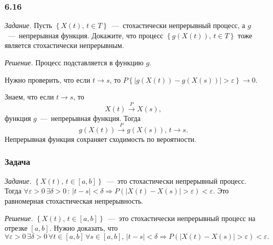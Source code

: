 \subsubsection*{6.16}

\textit{Задание.}
Пусть $ \left\{ X \left( t \right), \, t \in T \right\} $~---~стохастически непрерывный процесс,
а $g$~---~непрерывная функция.
Докажите, что процесс $ \left\{ g \left( X \left( t \right) \right), \, t \in T \right\} $
тоже является стохастически непрерывным.

\textit{Решение.}
Процесс подставляется в функцию $g$.

Нужно проверить, что если $t \to s$, то
$P \left\{
    \left| g \left( X \left( t \right) \right) - g \left( X \left( s \right) \right) \right| >
    \varepsilon \right\}
  \to 0$.

Знаем, что если $t \to s$, то
\begin{equation*}
  X \left( t \right) \overset{P}{ \to }
  X \left( s \right),
\end{equation*}
функция $g$~---~непрерывная функция.
Тогда
\begin{equation*}
  g \left( X \left( t \right) \right) \overset{P}{ \to } g \left( X \left( s \right) \right), \,
  t \to s.
\end{equation*}
Непрерывная функция сохраняет сходимость по вероятности.

\subsubsection*{Задача}

\textit{Задание.}
$ \left\{ X \left( t \right), \, t \in \left[ a, b \right] \right\}$~---~это
стохастически непрерывный процесс.
Тогда
$ \forall \varepsilon > 0 \,
  \exists \delta > 0 \, : \,
  \left| t - s \right| < \delta \Rightarrow
  P \left( \left| X \left( t \right) - X \left( s \right) \right| > \varepsilon \right) <
  \varepsilon $.
Это равномерная стохастическая непрерывность.

\textit{Решение.}
$ \left\{ X \left( t \right), \, t \in \left[ a, b \right] \right\}$~---~это
стохастически непрерывный процесс на отрезке $ \left[ a, b \right] $.
Нужно доказать, что
\begin{equation*}
  \forall \varepsilon > 0 \,
  \exists \delta > 0 \,
  \forall t \in \left[ a, b \right] \,
  \forall s \in \left[ a, b \right], \,
  \left| t - s \right| < \delta \Rightarrow
  P \left( \left| X \left( t \right) - X \left( s \right) \right| > \varepsilon \right) <
  \varepsilon.
\end{equation*}

